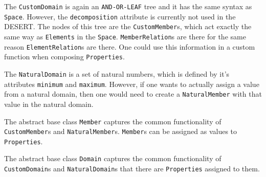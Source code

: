 \documentclass{article}
\begin{document}
{\par The {\tt CustomDomain} is  again an {\tt AND-OR-LEAF} tree and it has the same syntax as {\tt Space}. However, the {\tt decomposition} attribute is currently not used in the DESERT. The nodes of this tree are the {\tt CustomMember}s, which act exactly the same way as {\tt Elements} in the {\tt Space}. {\tt MemberRelation}s are there for the same reason {\tt ElementRelation}s are there. One could use this information in a custom function when composing {\tt Properties}.
}


{\par The {\tt NaturalDomain} is a set of natural numbers, which is defined by it's attributes {\tt minimum} and {\tt maximum}. However, if one wants to actually assign a value from a natural domain, then one would need to create a {\tt NaturalMember} with that value in the natural domain. 
}
{\par The abstract base class {\tt Member} captures the common functionality of {\tt CustomMember}s and {\tt NaturalMember}s. {\tt Member}s can be assigned as values to {\tt Properties}.
}

{\par The abstract base class {\tt Domain} captures the common functionality of {\tt CustomDomain}s and {\tt NaturalDomain}s that there are {\tt Properties} assigned to them.
}
\end{document}
